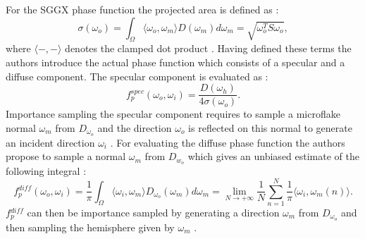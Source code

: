 For the SGGX phase function the projected area is defined as \cite{sggx}:
\begin{equation}
    \label{eq:projected_area}
    \sigma(\omega_o)=\int_\Omega \langle \omega_o, \omega_m \rangle D(\omega_m) d\omega_m = \sqrt{\omega_o^T S \omega_o},
\end{equation}
where $\langle -,-\rangle$ denotes the clamped dot product \cite{sggx}.
Having defined these terms the authors introduce the actual phase function which consists of a specular and a diffuse component.
The specular component is evaluated as \cite{sggx}:
\begin{equation}
    f{}^{spec}_p(\omega_o, \omega_i) = \frac{D(\omega_h)}{4 \sigma(\omega_o)}.
\end{equation}
Importance sampling the specular component requires to sample a microflake normal $\omega_m$ from $D_{\omega_o}$ and the direction $\omega_o$ is reflected on this normal to generate an incident direction $\omega_i$ \cite{sggx}.
For evaluating the diffuse phase function the authors propose to sample a normal $\omega_m$ from $D_{w_o}$ which gives an unbiased estimate of the following integral \cite{sggx}:
\begin{equation}
    f{}^{diff}_p(\omega_o, \omega_i) = \frac{1}{\pi}\int_\Omega \langle\omega_i,\omega_m\rangle D_{\omega_o}(\omega_m) d\omega_m = \lim \limits_{N \to +\infty} \frac{1}{N} \sum_{n=1}^N \frac{1}{\pi} \langle\omega_i,\omega_m(n)\rangle.
\end{equation}
$f{}^{diff}_p$ can then be importance sampled by generating a direction $\omega_m$ from $D_{\omega_o}$ and then sampling the hemisphere given by $\omega_m$ \cite{sggx}.

